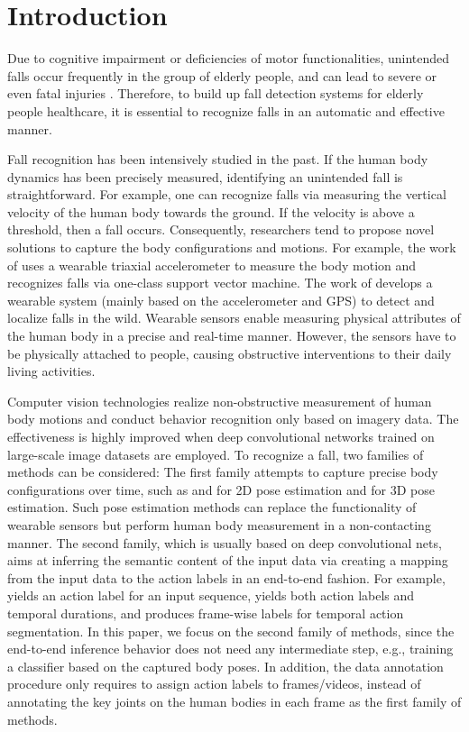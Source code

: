 \documentclass[runningheads]{llncs}
\begin{document}
\section{Introduction}
Due to cognitive impairment or deficiencies of motor functionalities, unintended falls occur frequently in the group of elderly people, and can lead to severe or even fatal injuries \cite{dykes2010fall} \cite{gillain2014falls}. Therefore, to build up fall detection systems for elderly people healthcare, it is essential to recognize falls in an automatic and effective manner. 


Fall recognition has been intensively studied in the past. If the human body dynamics has been precisely measured, identifying an unintended fall is straightforward. For example, one can recognize falls via measuring the vertical velocity of the human body towards the ground. If the velocity is above a threshold, then a fall occurs. Consequently, researchers tend to propose novel solutions to capture the body configurations and motions. For example, the work of \cite{zhang2006fall} uses a wearable triaxial accelerometer to measure the body motion and recognizes falls via one-class support vector machine. The work of \cite{wu2015development} develops a wearable system (mainly based on the accelerometer and GPS) to detect and localize falls in the wild. Wearable sensors enable measuring physical attributes of the human body in a precise and real-time manner. However, the sensors have to be physically attached to people, causing obstructive interventions to their daily living activities. 


Computer vision technologies realize non-obstructive measurement of human body motions and conduct behavior recognition only based on imagery data. The effectiveness is highly improved when deep convolutional networks trained on large-scale image datasets are employed. To recognize a fall, two families of methods can be considered: The first family attempts to capture precise body configurations over time, such as \cite{cao2017realtime} and \cite{insafutdinov2017cvpr} for 2D pose estimation and \cite{guler2018densepose} for 3D pose estimation. Such pose estimation methods can replace the functionality of wearable sensors but perform human body measurement in a non-contacting manner. The second family, which is usually based on deep convolutional nets, aims at inferring the semantic content of the input data via creating a mapping from the input data to the action labels in an end-to-end fashion. For example, \cite{simonyan2014two} yields an action label for an input sequence, \cite{neverova2014multi} yields both action labels and temporal durations, and \cite{Lea_2017_CVPR} produces frame-wise labels for temporal action segmentation. In this paper, we focus on the second family of methods, since the end-to-end inference behavior does not need any intermediate step, e.g., training a classifier based on the captured body poses. In addition, the data annotation procedure only requires to assign action labels to frames/videos, instead of annotating the key joints on the human bodies in each frame as the first family of methods.
\end{document}

